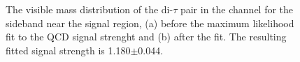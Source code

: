 \begin{figure}[h!]
\begin{center}
\end{center}
\caption{The visible mass distribution of the di-$\tau$ pair in the \mutau channel for the sideband near the signal region, (a) before
the maximum likelihood fit to the QCD signal strenght and (b) after the fit. The resulting fitted signal strength 
is 1.180$\pm$0.044.}
\label{fig:mssm_qcdosss_mtnear}
\end{figure}

